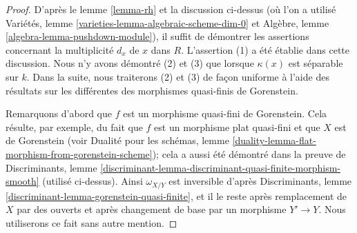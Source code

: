 \begin{proof}
D'après le lemme \ref{lemma-rh} et la discussion ci-dessus (où l'on a utilisé Variétés, lemme \ref{varieties-lemma-algebraic-scheme-dim-0} et Algèbre, lemme \ref{algebra-lemma-pushdown-module}), il suffit de démontrer les assertions concernant la multiplicité $d_x$ de $x$ dans $R$. L'assertion (1) a été établie dans cette discussion. Nous n'y avons démontré (2) et (3) que lorsque $\kappa(x)$ est séparable sur $k$. Dans la suite, nous traiterons (2) et (3) de façon uniforme à l'aide des résultats sur les différentes des morphismes quasi-finis de Gorenstein.

\medskip\noindent
Remarquons d'abord que $f$ est un morphisme quasi-fini de Gorenstein. Cela résulte, par exemple, du fait que $f$ est un morphisme plat quasi-fini et que $X$ est de Gorenstein (voir Dualité pour les schémas, lemme \ref{duality-lemma-flat-morphism-from-gorenstein-scheme}); cela a aussi été démontré dans la preuve de Discriminants, lemme \ref{discriminant-lemma-discriminant-quasi-finite-morphism-smooth} (utilisé ci-dessus). Ainsi $\omega_{X/Y}$ est inversible d'après Discriminants, lemme \ref{discriminant-lemma-gorenstein-quasi-finite}, et il le reste après remplacement de $X$ par des ouverts et après changement de base par un morphisme $Y' \to Y$. Nous utiliserons ce fait sans autre mention.


\end{proof}
